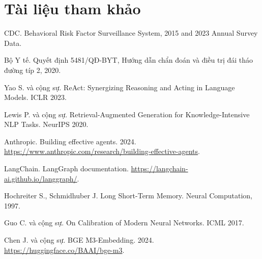 \documentclass[11pt,a4paper]{article}
\begin{document}
\section*{Tài liệu tham khảo}
\sloppy
\begin{enumerate}[label={[\arabic*]}]
  \item CDC. Behavioral Risk Factor Surveillance System, 2015 and 2023 Annual Survey Data.
  \item Bộ Y tế. Quyết định 5481/QĐ-BYT, Hướng dẫn chẩn đoán và điều trị đái tháo đường típ 2, 2020.
  \item Yao S. và cộng sự. ReAct: Synergizing Reasoning and Acting in Language Models. ICLR 2023.
  \item Lewis P. và cộng sự. Retrieval-Augmented Generation for Knowledge-Intensive NLP Tasks. NeurIPS 2020.
  \item Anthropic. Building effective agents. 2024. \url{https://www.anthropic.com/research/building-effective-agents}.
  \item LangChain. LangGraph documentation. \url{https://langchain-ai.github.io/langgraph/}.
  \item Hochreiter S., Schmidhuber J. Long Short-Term Memory. Neural Computation, 1997.
  \item Guo C. và cộng sự. On Calibration of Modern Neural Networks. ICML 2017.
  \item Chen J. và cộng sự. BGE M3-Embedding. 2024. \url{https://huggingface.co/BAAI/bge-m3}.
\end{enumerate}
\end{document}
